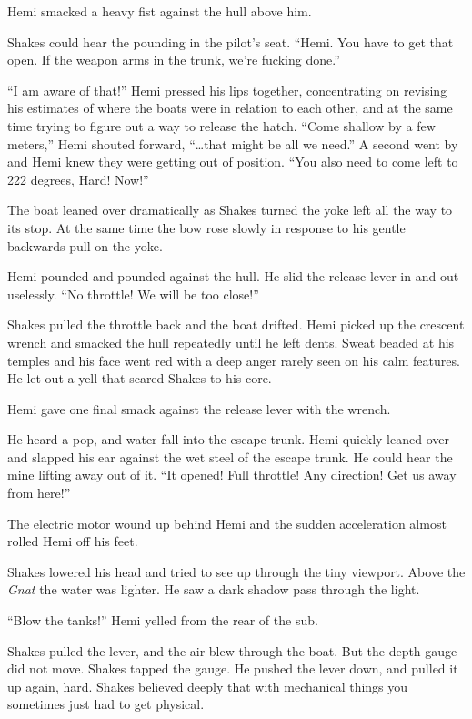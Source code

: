 \documentclass[]{scrbook}
\begin{document}
Hemi smacked a heavy fist against the hull above him.

Shakes could hear the pounding in the pilot's seat. ``Hemi. You have to
get that open. If the weapon arms in the trunk, we're fucking done.''

``I am aware of that!'' Hemi pressed his lips together, concentrating on
revising his estimates of where the boats were in relation to each
other, and at the same time trying to figure out a way to release the
hatch. ``Come shallow by a few meters,'' Hemi shouted forward,
``\ldots{}that might be all we need.'' A second went by and Hemi knew
they were getting out of position. ``You also need to come left to 222
degrees, Hard! Now!''

The boat leaned over dramatically as Shakes turned the yoke left all the
way to its stop. At the same time the bow rose slowly in response to his
gentle backwards pull on the yoke.

Hemi pounded and pounded against the hull. He slid the release lever in
and out uselessly. ``No throttle! We will be too close!''

Shakes pulled the throttle back and the boat drifted. Hemi picked up the
crescent wrench and smacked the hull repeatedly until he left dents.
Sweat beaded at his temples and his face went red with a deep anger
rarely seen on his calm features. He let out a yell that scared Shakes
to his core.

Hemi gave one final smack against the release lever with the wrench.

He heard a pop, and water fall into the escape trunk. Hemi quickly
leaned over and slapped his ear against the wet steel of the escape
trunk. He could hear the mine lifting away out of it. ``It opened! Full
throttle! Any direction! Get us away from here!''

The electric motor wound up behind Hemi and the sudden acceleration
almost rolled Hemi off his feet.

Shakes lowered his head and tried to see up through the tiny viewport.
Above the \emph{Gnat} the water was lighter. He saw a dark shadow pass
through the light.

``Blow the tanks!'' Hemi yelled from the rear of the sub.

Shakes pulled the lever, and the air blew through the boat. But the
depth gauge did not move. Shakes tapped the gauge. He pushed the lever
down, and pulled it up again, hard. Shakes believed deeply that with
mechanical things you sometimes just had to get physical.
\end{document}
